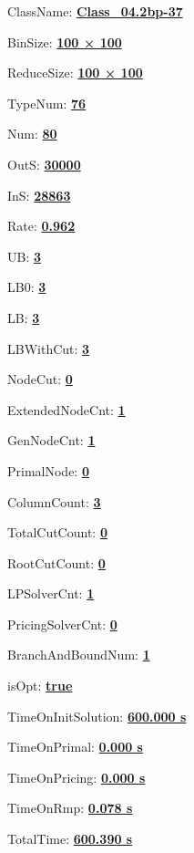 \documentclass[11pt]{article}
\begin{document}
\pagestyle{empty}


ClassName: \underline{\textbf{Class_04.2bp-37}}
\par
BinSize: \underline{\textbf{100 × 100}}
\par
ReduceSize: \underline{\textbf{100 × 100}}
\par
TypeNum: \underline{\textbf{76}}
\par
Num: \underline{\textbf{80}}
\par
OutS: \underline{\textbf{30000}}
\par
InS: \underline{\textbf{28863}}
\par
Rate: \underline{\textbf{0.962}}
\par
UB: \underline{\textbf{3}}
\par
LB0: \underline{\textbf{3}}
\par
LB: \underline{\textbf{3}}
\par
LBWithCut: \underline{\textbf{3}}
\par
NodeCut: \underline{\textbf{0}}
\par
ExtendedNodeCnt: \underline{\textbf{1}}
\par
GenNodeCnt: \underline{\textbf{1}}
\par
PrimalNode: \underline{\textbf{0}}
\par
ColumnCount: \underline{\textbf{3}}
\par
TotalCutCount: \underline{\textbf{0}}
\par
RootCutCount: \underline{\textbf{0}}
\par
LPSolverCnt: \underline{\textbf{1}}
\par
PricingSolverCnt: \underline{\textbf{0}}
\par
BranchAndBoundNum: \underline{\textbf{1}}
\par
isOpt: \underline{\textbf{true}}
\par
TimeOnInitSolution: \underline{\textbf{600.000 s}}
\par
TimeOnPrimal: \underline{\textbf{0.000 s}}
\par
TimeOnPricing: \underline{\textbf{0.000 s}}
\par
TimeOnRmp: \underline{\textbf{0.078 s}}
\par
TotalTime: \underline{\textbf{600.390 s}}
\par
\newpage
\end{document}
